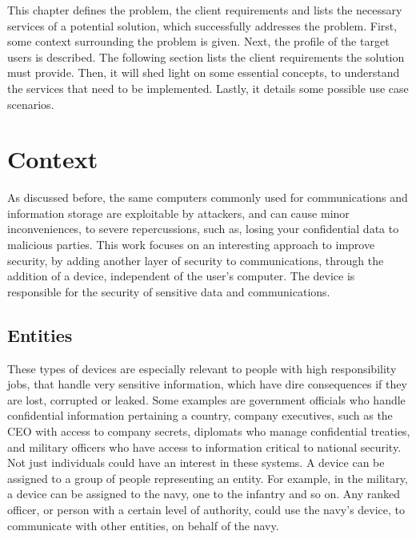 \cleardoublepage
\label{chap:problem}

This chapter defines the problem, the client requirements and lists the necessary services of a potential solution, which successfully addresses the problem.
First, some context surrounding the problem is given. Next, the profile of the target users is described. The following section lists the client requirements the solution must provide.
Then, it will shed light on some essential concepts, to understand the services that need to be implemented. Lastly, it details some possible use case scenarios.

\section{Context}\label{chap:problem:context}

As discussed before, the same computers commonly used for communications and information storage are exploitable by attackers, and can cause minor inconveniences, to severe repercussions, such as, losing your confidential data to malicious parties.
This work focuses on an interesting approach to improve security, by adding another layer of security to communications, through the addition of a device, independent of the user's computer. The device is responsible for the security of sensitive data and communications.

\subsection{Entities}\label{chap:problem:entities}

These types of devices are especially relevant to people with high responsibility jobs, that handle very sensitive information, which have dire consequences if they are lost, corrupted or leaked.
Some examples are government officials who handle confidential information pertaining a country, company executives, such as the CEO with access to company secrets, diplomats who manage confidential treaties, and military officers who have access to information critical to national security.
Not just individuals could have an interest in these systems. A device can be assigned to a group of people representing an entity. For example, in the military, a device can be assigned to the navy, one to the infantry and so on. Any ranked officer, or person with a certain level of authority, could use the navy's device, to communicate with other entities, on behalf of the navy.

